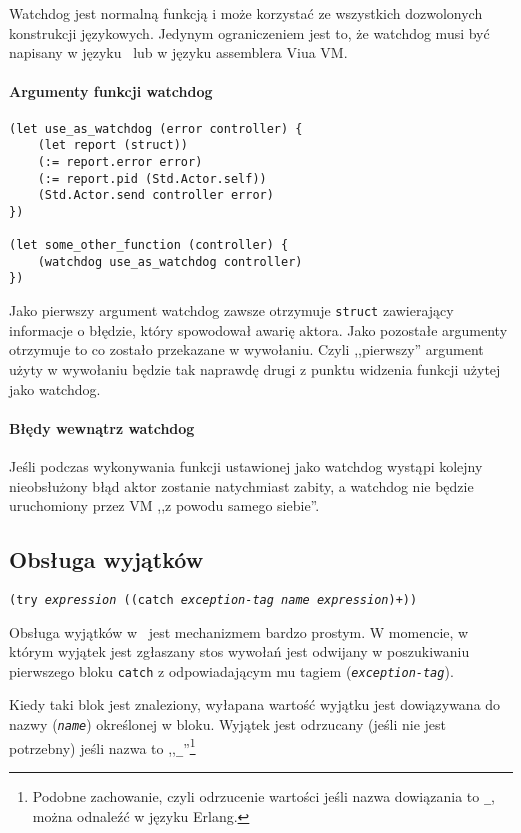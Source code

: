 Watchdog jest normalną funkcją i może korzystać ze wszystkich dozwolonych konstrukcji językowych.
Jedynym ograniczeniem jest to, że watchdog musi być napisany w języku \ViuAct\ lub w języku assemblera Viua VM.

\paragraph*{Argumenty funkcji watchdog}

\begin{lstlisting}
(let use_as_watchdog (error controller) {
    (let report (struct))
    (:= report.error error)
    (:= report.pid (Std.Actor.self))
    (Std.Actor.send controller error)
})

(let some_other_function (controller) {
    (watchdog use_as_watchdog controller)
})
\end{lstlisting}

Jako pierwszy argument watchdog zawsze otrzymuje \texttt{struct} zawierający informacje o błędzie, który
spowodował awarię aktora. Jako pozostałe argumenty otrzymuje to co zostało przekazane w wywołaniu.
Czyli ,,pierwszy'' argument użyty w wywołaniu będzie tak naprawdę drugi z punktu widzenia funkcji użytej jako
watchdog.

\paragraph*{Błędy wewnątrz watchdog}

Jeśli podczas wykonywania funkcji ustawionej jako watchdog wystąpi kolejny nieobsłużony błąd aktor zostanie
natychmiast zabity, a watchdog nie będzie uruchomiony przez VM ,,z powodu samego siebie''.

\subsection{Obsługa wyjątków}

\texttt{(try \emph{expression} ((catch \emph{exception-tag} \emph{name} \emph{expression})+))}
\vspace{1em}

Obsługa wyjątków w \ViuAct\ jest mechanizmem bardzo prostym. W momencie, w którym wyjątek jest zgłaszany
stos wywołań jest odwijany w poszukiwaniu pierwszego bloku \texttt{catch} z odpowiadającym mu
tagiem (\texttt{\emph{exception-tag}}).

Kiedy taki blok jest znaleziony, wyłapana wartość wyjątku jest dowiązywana do nazwy (\texttt{\emph{name}})
określonej w bloku. Wyjątek jest odrzucany (jeśli nie jest potrzebny) jeśli nazwa to
,,\texttt{\_}''\footnote{Podobne zachowanie, czyli odrzucenie wartości jeśli nazwa dowiązania to
\texttt{\_}, można odnaleźć w języku Erlang.}

